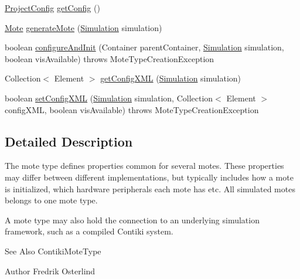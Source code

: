 \begin{DoxyCompactItemize}
\item 
\hyperlink{classorg_1_1contikios_1_1cooja_1_1ProjectConfig}{Project\-Config} \hyperlink{interfaceorg_1_1contikios_1_1cooja_1_1MoteType_a96c0995e376950797ef6ae3da8b7c4ad}{get\-Config} ()
\item 
\hyperlink{interfaceorg_1_1contikios_1_1cooja_1_1Mote}{Mote} \hyperlink{interfaceorg_1_1contikios_1_1cooja_1_1MoteType_ae7196f6079178449410ed39f316c61bc}{generate\-Mote} (\hyperlink{classorg_1_1contikios_1_1cooja_1_1Simulation}{Simulation} simulation)
\item 
boolean \hyperlink{interfaceorg_1_1contikios_1_1cooja_1_1MoteType_a0f5fa8e60a5915b861e901de12bd3950}{configure\-And\-Init} (Container parent\-Container, \hyperlink{classorg_1_1contikios_1_1cooja_1_1Simulation}{Simulation} simulation, boolean vis\-Available)  throws Mote\-Type\-Creation\-Exception
\item 
Collection$<$ Element $>$ \hyperlink{interfaceorg_1_1contikios_1_1cooja_1_1MoteType_a657760f0f720ecd7c6e3c0f96d14eb4c}{get\-Config\-X\-M\-L} (\hyperlink{classorg_1_1contikios_1_1cooja_1_1Simulation}{Simulation} simulation)
\item 
boolean \hyperlink{interfaceorg_1_1contikios_1_1cooja_1_1MoteType_a3cfa85468d7f64ff7d2f28ee498cabca}{set\-Config\-X\-M\-L} (\hyperlink{classorg_1_1contikios_1_1cooja_1_1Simulation}{Simulation} simulation, Collection$<$ Element $>$ config\-X\-M\-L, boolean vis\-Available)  throws Mote\-Type\-Creation\-Exception
\end{DoxyCompactItemize}


\subsection{Detailed Description}
The mote type defines properties common for several motes. These properties may differ between different implementations, but typically includes how a mote is initialized, which hardware peripherals each mote has etc. All simulated motes belongs to one mote type.

A mote type may also hold the connection to an underlying simulation framework, such as a compiled Contiki system.

\begin{DoxySeeAlso}{See Also}
Contiki\-Mote\-Type 
\end{DoxySeeAlso}
\begin{DoxyAuthor}{Author}
Fredrik Osterlind 
\end{DoxyAuthor}


